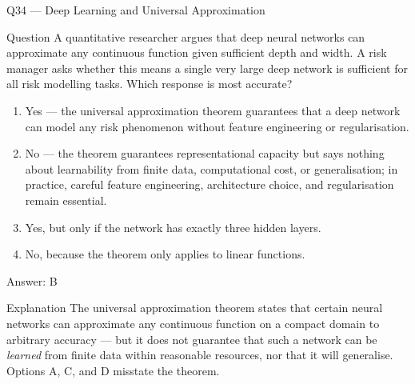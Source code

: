 \documentclass[aspectratio=169,8pt]{beamer}
\begin{document}
	\begin{frame}{Q34 --- Deep Learning and Universal Approximation}
		\begin{block}{Question}
			A quantitative researcher argues that deep neural networks can approximate any continuous function given sufficient depth and width. A risk manager asks whether this means a single very large deep network is sufficient for all risk modelling tasks. Which response is most accurate?
		\end{block}
		\begin{enumerate}
			\item Yes --- the universal approximation theorem guarantees that a deep network can model any risk phenomenon without feature engineering or regularisation.
			\item No --- the theorem guarantees representational capacity but says nothing about learnability from finite data, computational cost, or generalisation; in practice, careful feature engineering, architecture choice, and regularisation remain essential.
			\item Yes, but only if the network has exactly three hidden layers.
			\item No, because the theorem only applies to linear functions.
		\end{enumerate}
		\begin{exampleblock}{Answer: B}\end{exampleblock}
		\begin{block}{Explanation}
			The universal approximation theorem states that certain neural networks can approximate any continuous function on a compact domain to arbitrary accuracy --- but it does not guarantee that such a network can be \emph{learned} from finite data within reasonable resources, nor that it will generalise. Options A, C, and D misstate the theorem.
		\end{block}
	\end{frame}
	
\end{document}

